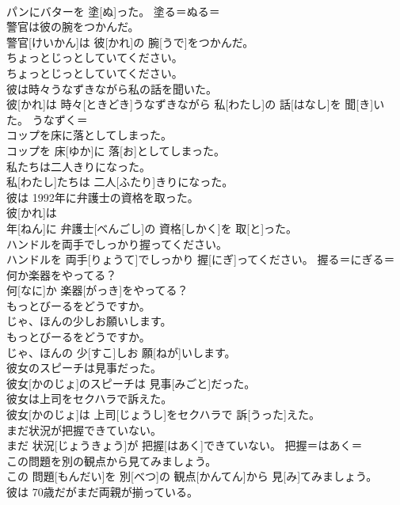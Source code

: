 \documentclass[8pt]{extreport}
\begin{document}
\begin{CJK}{UTF8}{min}
\\	パンにバターを 塗[ぬ]った。	塗る＝ぬる＝ 
\\	警官は彼の腕をつかんだ。	
\\	警官[けいかん]は 彼[かれ]の 腕[うで]をつかんだ。	
\\	ちょっとじっとしていてください。	
\\	ちょっとじっとしていてください。	
\\	彼は時々うなずきながら私の話を聞いた。	
\\	彼[かれ]は 時々[ときどき]うなずきながら 私[わたし]の 話[はなし]を 聞[き]いた。	うなずく＝ 
\\	コップを床に落としてしまった。	
\\	コップを 床[ゆか]に 落[お]としてしまった。	
\\	私たちは二人きりになった。	
\\	私[わたし]たちは 二人[ふたり]きりになった。	
\\	彼は 1992年に弁護士の資格を取った。	
\\	彼[かれ]は 
\\	年[ねん]に 弁護士[べんごし]の 資格[しかく]を 取[と]った。	
\\	ハンドルを両手でしっかり握ってください。	
\\	ハンドルを 両手[りょうて]でしっかり 握[にぎ]ってください。	握る＝にぎる＝ 
\\	何か楽器をやってる？	
\\	何[なに]か 楽器[がっき]をやってる？	
\\	もっとびーるをどうですか。 
\\	じゃ、ほんの少しお願いします。	
\\	もっとびーるをどうですか。 
\\	じゃ、ほんの 少[すこ]しお 願[ねが]いします。	
\\	彼女のスピーチは見事だった。	
\\	彼女[かのじょ]のスピーチは 見事[みごと]だった。	
\\	彼女は上司をセクハラで訴えた。	
\\	彼女[かのじょ]は 上司[じょうし]をセクハラで 訴[うった]えた。	
\\	まだ状況が把握できていない。	
\\	まだ 状況[じょうきょう]が 把握[はあく]できていない。	把握＝はあく＝ 
\\	この問題を別の観点から見てみましょう。	
\\	この 問題[もんだい]を 別[べつ]の 観点[かんてん]から 見[み]てみましょう。	
\\	彼は 70歳だがまだ両親が揃っている。	

\end{CJK}
\end{document}
